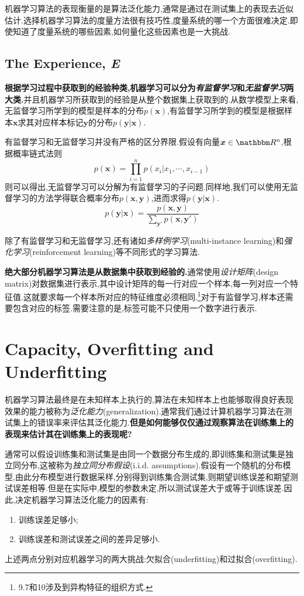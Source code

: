 机器学习算法的表现衡量的是算法泛化能力,通常是通过在测试集上的表现去近似估计.选择机器学习算法的度量方法很有技巧性,度量系统的哪一个方面很难决定.即使知道了度量系统的哪些因素,如何量化这些因素也是一大挑战.

\subsection{The Experience, \textit E}

\textbf{根据学习过程中获取到的经验种类,机器学习可以分为\textit{有监督学习}和\textit{无监督学习}两大类.}并且机器学习所获取到的经验是从整个数据集上获取到的.从数学模型上来看,无监督学习所学到的模型是样本的分布$p(\bm x)$,有监督学习所学到的模型是根据样本$\bm x$求其对应样本标记$\bm y$的分布$p(\bm y|\bm x)$.

有监督学习和无监督学习并没有严格的区分界限.假设有向量$\bm x\in\mathbbm R^n$,根据概率链式法则
\begin{equation}
p(\bm x)=\prod_{i=1}^np(x_i|x_1,\cdots,x_{i-1})
\end{equation}
则可以得出,无监督学习可以分解为有监督学习的子问题.同样地,我们可以使用无监督学习的方法学得联合概率分布$p(\bm x, \bm y)$,进而求得$p(\bm y|\bm x)$.
\begin{equation}
p(\bm y|\bm x)=\frac{p(\bm{x,y})}{\sum_{\bm y'}p(\bm x,\bm y')}
\end{equation}

除了有监督学习和无监督学习,还有诸如\textit{多样例学习}(multi-instance learning)和\textit{强化学习}(reinforcement learning)等不同形式的学习算法.

\textbf{绝大部分机器学习算法是从数据集中获取到经验的.}通常使用\textit{设计矩阵}(design matrix)对数据集进行表示,其中设计矩阵的每一行对应一个样本,每一列对应一个特征值.这就要求每一个样本所对应的特征维度必须相同.\footnote{9.7和10涉及到异构特征的组织方式.}对于有监督学习,样本还需要包含对应的标签.需要注意的是,标签可能不只使用一个数字进行表示.

\section{Capacity, Overfitting and Underfitting}

机器学习算法最终是在未知样本上执行的,算法在未知样本上也能够取得良好表现效果的能力被称为\textit{泛化能力}(generalization).通常我们通过计算机器学习算法在测试集上的错误率来评估其泛化能力.\textbf{但是如何能够仅仅通过观察算法在训练集上的表现来估计其在训练集上的表现呢?}

通常可以假设训练集和测试集是由同一个数据分布生成的,即训练集和测试集是独立同分布,这被称为\textit{独立同分布假设}(i.i.d. assumptions).假设有一个随机的分布模型,由此分布模型进行数据采样,分别得到训练集合测试集,则期望训练误差和期望测试误差相等.但是在实际中,模型的参数未定,所以测试误差大于或等于训练误差.因此,决定机器学习算法泛化能力的因素有:
\begin{enumerate}
\item 训练误差足够小;
\item 训练误差和测试误差之间的差异足够小.
\end{enumerate}
上述两点分别对应机器学习的两大挑战:欠拟合(underfitting)和过拟合(overfitting).

